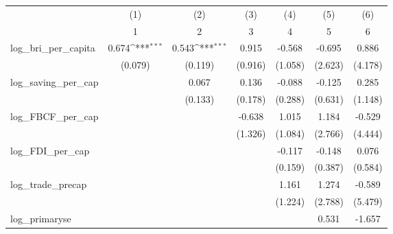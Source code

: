 {
\def\sym#1{\ifmmode^{#1}\else\(^{#1}\)\fi}
\begin{tabular}{l*{6}{c}}
\toprule
            &\multicolumn{1}{c}{(1)}&\multicolumn{1}{c}{(2)}&\multicolumn{1}{c}{(3)}&\multicolumn{1}{c}{(4)}&\multicolumn{1}{c}{(5)}&\multicolumn{1}{c}{(6)}\\
            &\multicolumn{1}{c}{1}&\multicolumn{1}{c}{2}&\multicolumn{1}{c}{3}&\multicolumn{1}{c}{4}&\multicolumn{1}{c}{5}&\multicolumn{1}{c}{6}\\
\midrule
log\_bri\_per\_capita&       0.674\sym{***}&       0.543\sym{***}&       0.915         &      -0.568         &      -0.695         &       0.886         \\
            &     (0.079)         &     (0.119)         &     (0.916)         &     (1.058)         &     (2.623)         &     (4.178)         \\
\addlinespace
log\_saving\_per\_cap&                     &       0.067         &       0.136         &      -0.088         &      -0.125         &       0.285         \\
            &                     &     (0.133)         &     (0.178)         &     (0.288)         &     (0.631)         &     (1.148)         \\
\addlinespace
log\_FBCF\_per\_cap&                     &                     &      -0.638         &       1.015         &       1.184         &      -0.529         \\
            &                     &                     &     (1.326)         &     (1.084)         &     (2.766)         &     (4.444)         \\
\addlinespace
log\_FDI\_per\_cap&                     &                     &                     &      -0.117         &      -0.148         &       0.076         \\
            &                     &                     &                     &     (0.159)         &     (0.387)         &     (0.584)         \\
\addlinespace
log\_trade\_precap&                     &                     &                     &       1.161         &       1.274         &      -0.589         \\
            &                     &                     &                     &     (1.224)         &     (2.788)         &     (5.479)         \\
\addlinespace
log\_primaryse&                     &                     &                     &                     &       0.531         &      -1.657         \\

\end{tabular}}
